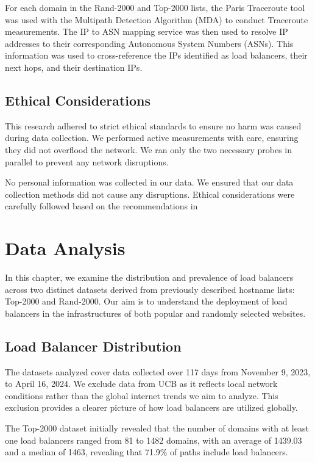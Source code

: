 \documentclass[12pt]{cwru_thesis}
\begin{document}
For each domain in the Rand-2000 and Top-2000 lists, the Paris Traceroute tool was used with the Multipath Detection Algorithm (MDA) to conduct Traceroute measurements. The IP to ASN mapping service was then used to resolve IP addresses to their corresponding Autonomous System Numbers (ASNs). This information was used to cross-reference the IPs identified as load balancers, their next hops, and their destination IPs.

\section{Ethical Considerations}

This research adhered to strict ethical standards to ensure no harm was caused during data collection. We performed active measurements with care, ensuring they did not overflood the network. We ran only the two necessary probes in parallel to prevent any network disruptions.

No personal information was collected in our data. We ensured that our data collection methods did not cause any disruptions. Ethical considerations were carefully followed based on the recommendations in  \cite{partridge2016ethical}



\chapter{Data Analysis}

In this chapter, we examine the distribution and prevalence of load balancers across two distinct datasets derived from previously described hostname lists: Top-2000 and Rand-2000. Our aim is to understand the deployment of load balancers in the infrastructures of both popular and randomly selected websites.

\section{Load Balancer Distribution}

The datasets analyzed cover data collected over 117 days from November 9, 2023, to April 16, 2024. We exclude data from UCB as it reflects local network conditions rather than the global internet trends we aim to analyze. This exclusion provides a clearer picture of how load balancers are utilized globally.

The Top-2000 dataset initially revealed that the number of domains with at least one load balancers ranged from 81 to 1482 domains, with an average of 1439.03 and a median of 1463, revealing that 71.9\% of paths include load balancers.
\end{document}

